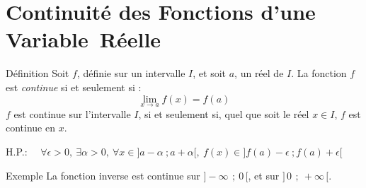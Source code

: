 \documentclass{coursbook}
\begin{document}
    \chapter{Continuité des Fonctions d'une Variable~Réelle}

    \begin{Gpartie}{Définition}
        Soit $f$, définie sur un intervalle $I$, et soit $a$, un réel de $I$.
        La fonction $f$ est \emph{continue} si et seulement si : \[\boxed{\lim_{x \to a} f(x)=f(a)}\]
        $f$ est continue sur l'intervalle $I$, si et seulement si, quel que soit le réel $x\in I$, $f$ est continue en $x$.

        H.P.: $\quad\forall\epsilon >0,~\exists\alpha >0,~\forall x\in\big]a-\alpha~;a+\alpha\big[,~f(x)\in\big]f(a)-\epsilon~;f(a)+\epsilon\big[$
        \begin{Spartie}{Exemple}
            La fonction inverse est continue sur $\big]-\infty\,~;~0\,\big[$, et sur $\big]\,0\,~;~+\infty\,\big[$.


\end{Spartie}
\end{Gpartie}
\end{document}
